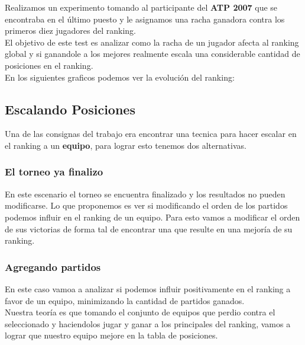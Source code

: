 Realizamos un experimento tomando al participante del \textbf{ATP 2007} que se encontraba en el último puesto y le asignamos una racha ganadora contra los primeros diez jugadores del ranking. \\

El objetivo de este test es analizar como la racha de un jugador afecta al ranking global y si ganandole a los mejores realmente escala una considerable cantidad de posiciones en el ranking. \\

En los siguientes graficos podemos ver la evolución del ranking: \\



\subsection{Escalando Posiciones}

Una de las consignas del trabajo era encontrar una tecnica para hacer escalar en el ranking a un \textbf{equipo}, para lograr esto tenemos dos alternativas. \\


\subsubsection{El torneo ya finalizo}

En este escenario el torneo se encuentra finalizado y los resultados no pueden modificarse. Lo que proponemos es ver si modificando el orden de los partidos podemos influir en el ranking de un equipo. Para esto vamos a modificar el orden de sus victorias de forma tal de encontrar una que resulte en una mejoría de su ranking. \\


\subsubsection{Agregando partidos}

En este caso vamoa a analizar si podemos influir positivamente en el ranking a favor de un equipo, minimizando la cantidad de partidos ganados. \\

Nuestra teoría es que tomando el conjunto de equipos que perdio contra el seleccionado y haciendolos jugar y ganar a los principales del ranking, vamos a lograr que nuestro equipo mejore en la tabla de posiciones. \\



